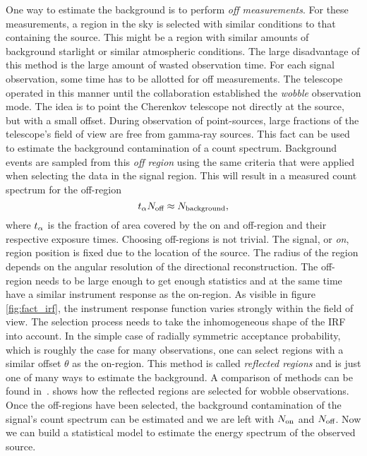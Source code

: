 One way to estimate the background is to perform \emph{off measurements}.
For these measurements, a region in the sky is selected with similar conditions to that containing the source. This might be a region with similar amounts 
of background starlight or similar atmospheric conditions. The large disadvantage of this method is the large amount of wasted observation time.
For each signal observation, some time has to be allotted for off measurements. The \whipple telescope operated in this manner
until the \hegra collaboration established the \emph{wobble} observation mode.
The idea is to point the Cherenkov telescope not directly at the source, but with a small offset.
During observation of point-sources, large fractions of the telescope's field of view are free from gamma-ray sources.
This fact can be used to estimate the background contamination of a count spectrum.
Background events are sampled from this \emph{off region} using the same criteria that were applied when selecting the data in the signal region.
This will result in a measured count spectrum for the off-region 
\begin{equation*}
  t_{\alpha} N_\text{off} \approx N_{\mathrm{background}},
\end{equation*}
where $t_{\alpha}$ is the fraction of area covered by the on and off-region and their respective exposure times.  
Choosing off-regions is not trivial. The signal, or \emph{on}, region position is fixed due to the location of the source. 
The radius of the region depends on the angular resolution of the directional reconstruction.
The off-region needs to be large enough to get enough statistics and at the same time have a similar instrument response
as the on-region. As visible in figure \ref{fig:fact_irf}, the instrument response function varies strongly within the field of view. 
The selection process needs to take the inhomogeneous shape of the IRF into account.
In the simple case of radially symmetric acceptance probability, which is roughly the case for many observations, one can select regions 
with a similar offset $\theta$ as the on-region.
This method is  called \emph{reflected regions} and is just one of many ways to estimate the background. A comparison of methods can be found in~\cite{iact_bkg}.
 shows how the reflected regions are selected for wobble observations. 
Once the off-regions have been selected, the background contamination of the signal's count spectrum can be estimated and we are left with $N_\text{on}$ and $N_\text{off}$.
Now we can build a statistical model to estimate the energy spectrum of the observed source.

